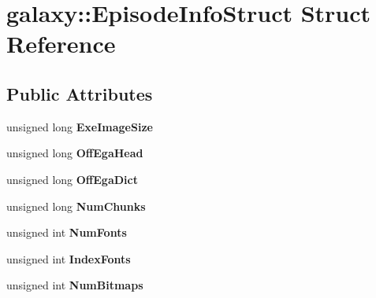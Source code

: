 \hypertarget{structgalaxy_1_1_episode_info_struct}{
\section{galaxy::EpisodeInfoStruct Struct Reference}
\label{structgalaxy_1_1_episode_info_struct}
}
\subsection*{Public Attributes}
\begin{DoxyCompactItemize}
\item 
\hypertarget{structgalaxy_1_1_episode_info_struct_ae2d5f028ddbd17068f083974107d3a37}{
unsigned long {\bfseries ExeImageSize}}
\label{structgalaxy_1_1_episode_info_struct_ae2d5f028ddbd17068f083974107d3a37}

\item 
\hypertarget{structgalaxy_1_1_episode_info_struct_a08ac46ddfc1ae6a2fe80ebcf0836fe92}{
unsigned long {\bfseries OffEgaHead}}
\label{structgalaxy_1_1_episode_info_struct_a08ac46ddfc1ae6a2fe80ebcf0836fe92}

\item 
\hypertarget{structgalaxy_1_1_episode_info_struct_af6837ca86d67bf9d8e63c88666dba746}{
unsigned long {\bfseries OffEgaDict}}
\label{structgalaxy_1_1_episode_info_struct_af6837ca86d67bf9d8e63c88666dba746}

\item 
\hypertarget{structgalaxy_1_1_episode_info_struct_a2b8656102d70a2b4c3646994aec7a9e9}{
unsigned long {\bfseries NumChunks}}
\label{structgalaxy_1_1_episode_info_struct_a2b8656102d70a2b4c3646994aec7a9e9}

\item 
\hypertarget{structgalaxy_1_1_episode_info_struct_a77c10091cea9cfc02c41c64a4826b0f1}{
unsigned int {\bfseries NumFonts}}
\label{structgalaxy_1_1_episode_info_struct_a77c10091cea9cfc02c41c64a4826b0f1}

\item 
\hypertarget{structgalaxy_1_1_episode_info_struct_a5470939742535d30a81b318591b7c47b}{
unsigned int {\bfseries IndexFonts}}
\label{structgalaxy_1_1_episode_info_struct_a5470939742535d30a81b318591b7c47b}

\item 
\hypertarget{structgalaxy_1_1_episode_info_struct_a25407ebd1a46d9c3af8b0952248c8d99}{
unsigned int {\bfseries NumBitmaps}}
\label{structgalaxy_1_1_episode_info_struct_a25407ebd1a46d9c3af8b0952248c8d99}


\end{DoxyCompactItemize}
